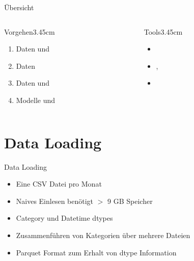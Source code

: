 \begin{frame}{Übersicht}
\begin{columns}
\begin{column}{0.5\textwidth}
\begin{MRuleBlock}{Vorgehen}{3.45cm}{\textwidth}
\begin{enumerate}
\item Daten  und 
\item Daten 
\item Daten  und 
\item Modelle  und 
\end{enumerate}
\end{MRuleBlock}
\end{column}
\begin{column}{0.5\textwidth }
\centering
\begin{MRuleBlock}{Tools}{3.45cm}{\textwidth}
\vspace{0.5\baselineskip}
\begin{itemize}
\item {}
\item {}, 
\item {}
\end{itemize}
\vspace{0.3\baselineskip}
\end{MRuleBlock}
\end{column}
\end{columns}
\end{frame}

\section{Data Loading}

\begin{frame}{Data Loading}
{
\begin{itemize}
\item Eine CSV Datei pro Monat
\item Naives Einlesen benötigt $>$ 9 GB Speicher
\end{itemize}
}
{
\begin{itemize}
\item Category und Datetime dtypes
\item Zusammenführen von Kategorien über mehrere Dateien
\item Parquet Format zum Erhalt von dtype Information
\end{itemize}
}
\end{frame}




